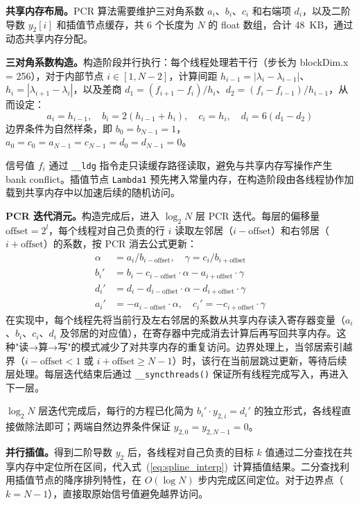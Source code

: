 \textbf{共享内存布局。}PCR 算法需要维护三对角系数 $a_i$、$b_i$、$c_i$ 和右端项 $d_i$，以及二阶导数 $y_2[i]$ 和插值节点缓存，共 6 个长度为 $N$ 的 float 数组，合计 48~KB，通过动态共享内存分配。

\textbf{三对角系数构造。}构造阶段并行执行：每个线程处理若干行（步长为 blockDim.x = 256），对于内部节点 $i \in [1, N-2]$，计算间距 $h_{i-1} = |\lambda_i - \lambda_{i-1}|$、$h_i = |\lambda_{i+1} - \lambda_i|$，以及差商 $d_1 = (f_{i+1} - f_i)/h_i$、$d_2 = (f_i - f_{i-1})/h_{i-1}$，从而设定：
\begin{equation}
a_i = h_{i-1}, \quad b_i = 2(h_{i-1} + h_i), \quad c_i = h_i, \quad d_i = 6(d_1 - d_2)
\end{equation}
边界条件为自然样条，即 $b_0 = b_{N-1} = 1$，$a_0 = c_0 = a_{N-1} = c_{N-1} = d_0 = d_{N-1} = 0$。

信号值 $f_i$ 通过 \texttt{\_\_ldg} 指令走只读缓存路径读取，避免与共享内存写操作产生 bank conflict。插值节点 \texttt{Lambda1} 预先拷入常量内存，在构造阶段由各线程协作加载到共享内存中以加速后续的随机访问。

\textbf{PCR 迭代消元。}构造完成后，进入 $\log_2 N$ 层 PCR 迭代。每层的偏移量 $\text{offset} = 2^l$，每个线程对自己负责的行 $i$ 读取左邻居（$i - \text{offset}$）和右邻居（$i + \text{offset}$）的系数，按 PCR 消去公式更新：
\begin{align}
\alpha &= a_i / b_{i-\text{offset}}, \quad \gamma = c_i / b_{i+\text{offset}} \\
b_i' &= b_i - c_{i-\text{offset}} \cdot \alpha - a_{i+\text{offset}} \cdot \gamma \\
d_i' &= d_i - d_{i-\text{offset}} \cdot \alpha - d_{i+\text{offset}} \cdot \gamma \\
a_i' &= -a_{i-\text{offset}} \cdot \alpha, \quad c_i' = -c_{i+\text{offset}} \cdot \gamma
\end{align}
在实现中，每个线程先将当前行及左右邻居的系数从共享内存读入寄存器变量（$a_i$、$b_i$、$c_i$、$d_i$ 及邻居的对应值），在寄存器中完成消去计算后再写回共享内存。这种"读→算→写"的模式减少了对共享内存的重复访问。边界处理上，当邻居索引越界（$i - \text{offset} < 1$ 或 $i + \text{offset} \geq N - 1$）时，该行在当前层跳过更新，等待后续层处理。每层迭代结束后通过 \texttt{\_\_syncthreads()} 保证所有线程完成写入，再进入下一层。

$\log_2 N$ 层迭代完成后，每行的方程已化简为 $b_i' \cdot y_{2,i} = d_i'$ 的独立形式，各线程直接做除法即可；两端自然边界条件保证 $y_{2,0} = y_{2,N-1} = 0$。

\textbf{并行插值。}得到二阶导数 $y_2$ 后，各线程对自己负责的目标 $k$ 值通过二分查找在共享内存中定位所在区间，代入式~(\ref{eq:spline_interp})~计算插值结果。二分查找利用插值节点的降序排列特性，在 $O(\log N)$ 步内完成区间定位。对于边界点（$k = N - 1$），直接取原始信号值避免越界访问。


